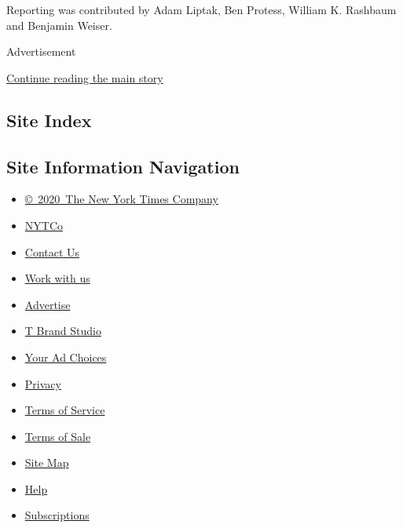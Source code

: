 Reporting was contributed by Adam Liptak, Ben Protess, William K.
Rashbaum and Benjamin Weiser.

Advertisement

\protect\hyperlink{after-bottom}{Continue reading the main story}

\hypertarget{site-index}{%
\subsection{Site Index}\label{site-index}}

\hypertarget{site-information-navigation}{%
\subsection{Site Information
Navigation}\label{site-information-navigation}}

\begin{itemize}
\tightlist
\item
  \href{https://help.nytimes3xbfgragh.onion/hc/en-us/articles/115014792127-Copyright-notice}{©~2020~The
  New York Times Company}
\end{itemize}

\begin{itemize}
\tightlist
\item
  \href{https://www.nytco.com/}{NYTCo}
\item
  \href{https://help.nytimes3xbfgragh.onion/hc/en-us/articles/115015385887-Contact-Us}{Contact
  Us}
\item
  \href{https://www.nytco.com/careers/}{Work with us}
\item
  \href{https://nytmediakit.com/}{Advertise}
\item
  \href{http://www.tbrandstudio.com/}{T Brand Studio}
\item
  \href{https://www.nytimes3xbfgragh.onion/privacy/cookie-policy\#how-do-i-manage-trackers}{Your
  Ad Choices}
\item
  \href{https://www.nytimes3xbfgragh.onion/privacy}{Privacy}
\item
  \href{https://help.nytimes3xbfgragh.onion/hc/en-us/articles/115014893428-Terms-of-service}{Terms
  of Service}
\item
  \href{https://help.nytimes3xbfgragh.onion/hc/en-us/articles/115014893968-Terms-of-sale}{Terms
  of Sale}
\item
  \href{https://spiderbites.nytimes3xbfgragh.onion}{Site Map}
\item
  \href{https://help.nytimes3xbfgragh.onion/hc/en-us}{Help}
\item
  \href{https://www.nytimes3xbfgragh.onion/subscription?campaignId=37WXW}{Subscriptions}
\end{itemize}
